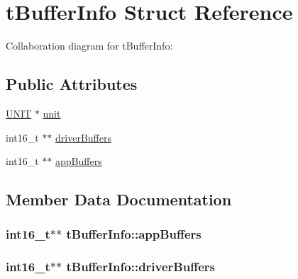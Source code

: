 \hypertarget{structtBufferInfo}{}\section{t\+Buffer\+Info Struct Reference}
\label{structtBufferInfo}


Collaboration diagram for t\+Buffer\+Info\+:
\subsection*{Public Attributes}
\begin{DoxyCompactItemize}
\item 
\hyperlink{structUNIT}{U\+N\+IT} $\ast$ \hyperlink{structtBufferInfo_a306319efa78abf4711eb3f8cb7370103}{unit}
\item 
int16\+\_\+t $\ast$$\ast$ \hyperlink{structtBufferInfo_ab7b03e3d626aadc35aeceb83e0b3fd27}{driver\+Buffers}
\item 
int16\+\_\+t $\ast$$\ast$ \hyperlink{structtBufferInfo_a6fe2ce98a9810fc9c1e4a63afbf300cb}{app\+Buffers}
\end{DoxyCompactItemize}


\subsection{Member Data Documentation}
\subsubsection[{\texorpdfstring{app\+Buffers}{appBuffers}}]{\setlength{\rightskip}{0pt plus 5cm}int16\+\_\+t$\ast$$\ast$ t\+Buffer\+Info\+::app\+Buffers}\hypertarget{structtBufferInfo_a6fe2ce98a9810fc9c1e4a63afbf300cb}{}\label{structtBufferInfo_a6fe2ce98a9810fc9c1e4a63afbf300cb}
\subsubsection[{\texorpdfstring{driver\+Buffers}{driverBuffers}}]{\setlength{\rightskip}{0pt plus 5cm}int16\+\_\+t$\ast$$\ast$ t\+Buffer\+Info\+::driver\+Buffers}\hypertarget{structtBufferInfo_ab7b03e3d626aadc35aeceb83e0b3fd27}{}\label{structtBufferInfo_ab7b03e3d626aadc35aeceb83e0b3fd27}
